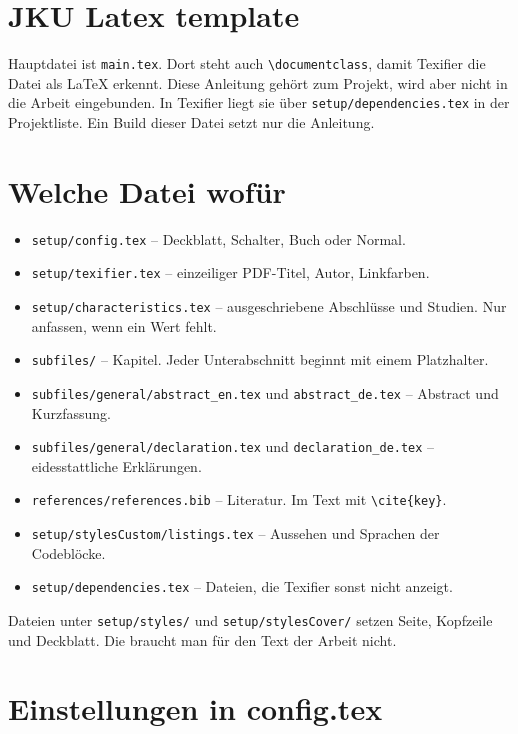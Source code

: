 \documentclass[11pt,a4paper]{article}
\begin{document}
\section*{JKU Latex template}

Hauptdatei ist \texttt{main.tex}. Dort steht auch \verb|\documentclass|, damit Texifier die Datei als LaTeX erkennt. Diese Anleitung gehört zum Projekt, wird aber nicht in die Arbeit eingebunden. In Texifier liegt sie über \texttt{setup/dependencies.tex} in der Projektliste. Ein Build dieser Datei setzt nur die Anleitung.

\section*{Welche Datei wofür}

\begin{itemize}
\item \texttt{setup/config.tex} -- Deckblatt, Schalter, Buch oder Normal.
\item \texttt{setup/texifier.tex} -- einzeiliger PDF-Titel, Autor, Linkfarben.
\item \texttt{setup/characteristics.tex} -- ausgeschriebene Abschlüsse und Studien. Nur anfassen, wenn ein Wert fehlt.
\item \texttt{subfiles/} -- Kapitel. Jeder Unterabschnitt beginnt mit einem Platzhalter.
\item \texttt{subfiles/general/abstract\_en.tex} und \texttt{abstract\_de.tex} -- Abstract und Kurzfassung.
\item \texttt{subfiles/general/declaration.tex} und \texttt{declaration\_de.tex} -- eidesstattliche Erklärungen.
\item \texttt{references/references.bib} -- Literatur. Im Text mit \verb|\cite{key}|.
\item \texttt{setup/stylesCustom/listings.tex} -- Aussehen und Sprachen der Codeblöcke.
\item \texttt{setup/dependencies.tex} -- Dateien, die Texifier sonst nicht anzeigt.
\end{itemize}

Dateien unter \texttt{setup/styles/} und \texttt{setup/stylesCover/} setzen Seite, Kopfzeile und Deckblatt. Die braucht man für den Text der Arbeit nicht.

\section*{Einstellungen in config.tex}
\end{document}

